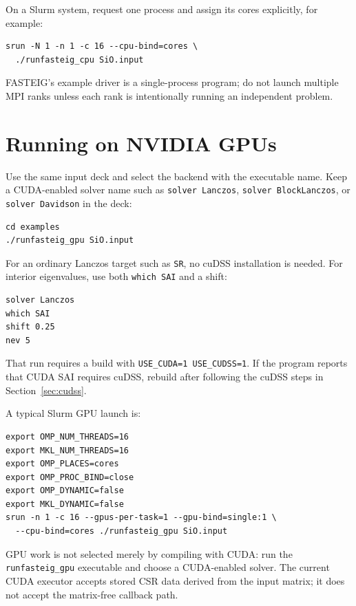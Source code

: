 \documentclass[11pt]{article}
\newcommand{\code}[1]{\texttt{#1}}
\begin{document}
On a Slurm system, request one process and assign its cores explicitly, for
example:

\begin{lstlisting}
srun -N 1 -n 1 -c 16 --cpu-bind=cores \
  ./runfasteig_cpu SiO.input
\end{lstlisting}

FASTEIG's example driver is a single-process program; do not launch multiple
MPI ranks unless each rank is intentionally running an independent problem.

\section{Running on NVIDIA GPUs}

Use the same input deck and select the backend with the executable name.  Keep
a CUDA-enabled solver name such as \code{solver Lanczos},
\code{solver BlockLanczos}, or \code{solver Davidson} in the deck:

\begin{lstlisting}
cd examples
./runfasteig_gpu SiO.input
\end{lstlisting}

For an ordinary Lanczos target such as \code{SR}, no cuDSS installation is
needed.  For interior eigenvalues, use both \code{which SAI} and a shift:

\begin{lstlisting}
solver Lanczos
which SAI
shift 0.25
nev 5
\end{lstlisting}

That run requires a build with \code{USE\_CUDA=1 USE\_CUDSS=1}.  If the program
reports that CUDA SAI requires cuDSS, rebuild after following the cuDSS steps
in Section~\ref{sec:cudss}.

A typical Slurm GPU launch is:

\begin{lstlisting}
export OMP_NUM_THREADS=16
export MKL_NUM_THREADS=16
export OMP_PLACES=cores
export OMP_PROC_BIND=close
export OMP_DYNAMIC=false
export MKL_DYNAMIC=false
srun -n 1 -c 16 --gpus-per-task=1 --gpu-bind=single:1 \
  --cpu-bind=cores ./runfasteig_gpu SiO.input
\end{lstlisting}

GPU work is not selected merely by compiling with CUDA: run the
\code{runfasteig\_gpu} executable and choose a CUDA-enabled solver.  The current
CUDA executor accepts stored CSR data derived from the input matrix; it does
not accept the matrix-free callback path.
\end{document}

